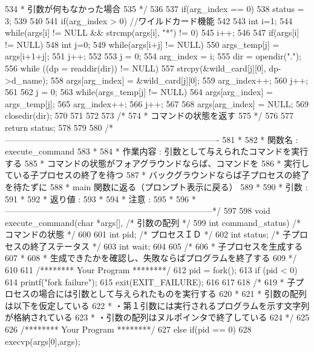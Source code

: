 \documentclass{procreport}
\begin{document}
\begin{verbatimtab}
{   534		 *  引数が何もなかった場合
   535		 */
   536	
   537		if(arg_index == 0) {
   538			status = 3;
   539		}
   540	
   541		if(arg_index > 0){				//ワイルドカード機能
   542	
   543			int i=1;
   544			while(args[i] != NULL && strcmp(args[i], "*") != 0){
   545			i++;
   546			}
   547			if(args[i] != NULL){
   548				int j=0;
   549				while(args[i+j] != NULL){
   550					args_temp[j] = args[i+1+j];
   551					j++;
   552				}
   553				j = 0;
   554				arg_index = i;
   555				dir = opendir(".");
   556				while ((dp = readdir(dir)) != NULL) {
   557					strcpy(&wild_card[j][0], dp->d_name);
   558					args[arg_index] = &wild_card[j][0];
   559					arg_index++;
   560					j++;
   561				}
   562				j = 0;
   563				while(args_temp[j] != NULL){
   564					args[arg_index] = args_temp[j];
   565					arg_index++;
   566					j++;
   567				}
   568				args[arg_index] = NULL;
   569				closedir(dir);
   570			}
   571		}
   572		
   573		/*
   574		 *  コマンドの状態を返す
   575		 */
   576	
   577		return status;
   578	}
   579	
   580	/*----------------------------------------------------------------------------
   581	 *
   582	 *  関数名   : execute_command
   583	 *
   584	 *  作業内容 : 引数として与えられたコマンドを実行する
   585	 *			 コマンドの状態がフォアグラウンドならば、コマンドを
   586	 *			 実行している子プロセスの終了を待つ
   587	 *			 バックグラウンドならば子プロセスの終了を待たずに
   588	 *			 main 関数に返る（プロンプト表示に戻る）
   589	 *
   590	 *  引数	 :
   591	 *
   592	 *  返り値   :
   593	 *
   594	 *  注意	 :
   595	 *
   596	 *--------------------------------------------------------------------------*/
   597	
   598	void execute_command(char *args[],	/* 引数の配列 */
   599						 int command_status)	 /* コマンドの状態 */
   600	{
   601		int pid;	  /* プロセスＩＤ */
   602		int status;   /* 子プロセスの終了ステータス */
   603		int wait;
   604		
   605		/*
   606		 *  子プロセスを生成する
   607		 *
   608		 *  生成できたかを確認し、失敗ならばプログラムを終了する
   609		 */
   610	
   611		/******** Your Program ********/
   612		pid = fork();
   613		if (pid < 0){
   614			printf("fork failure\n");
   615			exit(EXIT_FAILURE);
   616		}
   617	
   618		/*
   619		 *  子プロセスの場合には引数として与えられたものを実行する
   620		 *
   621		 *  引数の配列は以下を仮定している
   622		 *  ・第１引数には実行されるプログラムを示す文字列が格納されている
   623		 *  ・引数の配列はヌルポインタで終了している
   624		 */
   625	
   626		/******** Your Program ********/
   627		else if(pid == 0){
   628			execvp(args[0],args);
}}
\end{verbatimtab}
\end{document}
